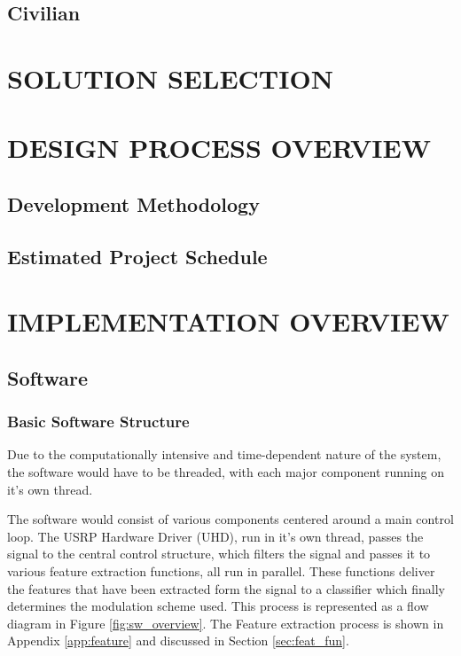 \documentclass[10pt,twocolumn]{witseiepaper}
\begin{document}
	\subsection{Civilian}

\section{SOLUTION SELECTION}

\section{DESIGN PROCESS OVERVIEW}
	\subsection{Development Methodology}
	\subsection{Estimated Project Schedule}


\section{IMPLEMENTATION OVERVIEW}

	\subsection{Software}
		\subsubsection{Basic Software Structure}
			Due to the computationally intensive and time-dependent nature of the system, the software would have to be threaded, with each major component running on it's own thread.

			The software would consist of various components centered around a main control loop. The USRP Hardware Driver (UHD), run in it's own thread, passes the signal to the central control structure, which filters the signal and passes it to various feature extraction functions, all run in parallel. These functions deliver the features that have been extracted form the signal to a classifier which finally determines the modulation scheme used. This process is represented as a flow diagram in Figure \ref{fig:sw_overview}. The Feature extraction process is shown in Appendix \ref{app:feature} and discussed in Section \ref{sec:feat_fun}.
\end{document}
